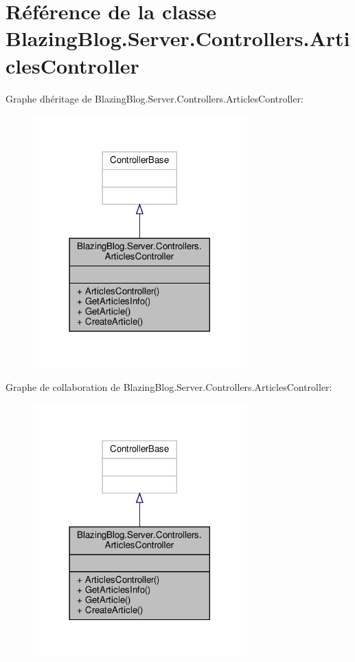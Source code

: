 \hypertarget{class_blazing_blog_1_1_server_1_1_controllers_1_1_articles_controller}{}\section{Référence de la classe Blazing\+Blog.\+Server.\+Controllers.\+Articles\+Controller}
\label{class_blazing_blog_1_1_server_1_1_controllers_1_1_articles_controller}


Graphe d\textquotesingle{}héritage de Blazing\+Blog.\+Server.\+Controllers.\+Articles\+Controller\+:\nopagebreak
\begin{figure}[H]
\begin{center}
\leavevmode
\includegraphics[width=233pt]{class_blazing_blog_1_1_server_1_1_controllers_1_1_articles_controller__inherit__graph}
\end{center}
\end{figure}


Graphe de collaboration de Blazing\+Blog.\+Server.\+Controllers.\+Articles\+Controller\+:\nopagebreak
\begin{figure}[H]
\begin{center}
\leavevmode
\includegraphics[width=233pt]{class_blazing_blog_1_1_server_1_1_controllers_1_1_articles_controller__coll__graph}
\end{center}
\end{figure}
